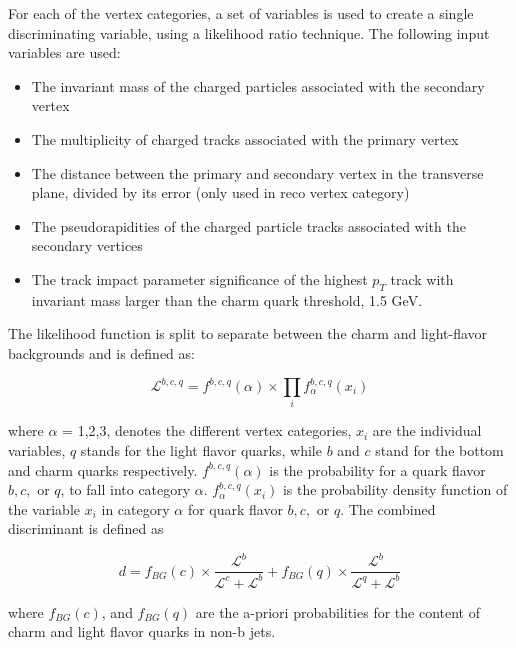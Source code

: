 \par For each of the vertex categories, a set of variables is used to
create a single discriminating variable, using a likelihood ratio
technique.  The following input variables are used:
\begin{itemize}
  \item The invariant mass of the charged particles associated with
    the secondary vertex
  \item The multiplicity of charged tracks associated with the primary
    vertex
  \item The distance between the primary and secondary vertex in the
    transverse plane, divided by its error (only used in reco vertex category)
  \item The pseudorapidities of the charged particle tracks associated
    with the secondary vertices
  \item The track impact parameter significance of the highest $p_{T}$
    track with invariant mass larger than the charm quark threshold,
    1.5 GeV. 
\end{itemize}

\noindent The likelihood function is split to separate between the
charm and light-flavor backgrounds and is defined as:

\begin{equation}\label{eq:csv_likelihood}
\mathcal{L}^{b,c,q} =
f^{b,c,q}(\alpha)\times\prod_{i}f_{\alpha}^{b,c,q}(x_{i})
\end{equation}

\noindent where $\alpha$ = 1,2,3, denotes the different vertex
categories, $x_{i}$ are the individual variables, $q$ stands for the
light flavor quarks, while $b$ and $c$ stand for the bottom and charm
quarks respectively.  $f^{b,c,q}(\alpha)$ is the probability for a
quark flavor $b,c,$ or $q$, to fall into category $\alpha$.
$f_{\alpha}^{b,c,q}(x_{i})$ is the probability density
function of the variable $x_{i}$ in category $\alpha$ for quark flavor
$b,c,$ or $q$.  The combined discriminant is defined as

\begin{equation}\label{eq:csv_disc}
d = f_{BG}(c)\times\frac{\mathcal{L}^{b}}{\mathcal{L}^{c} +
  \mathcal{L}^{b}} + f_{BG}(q)\times\frac{\mathcal{L}^{b}}{\mathcal{L}^{q} +
  \mathcal{L}^{b}}
\end{equation}

\noindent where $f_{BG}(c)$, and $f_{BG}(q)$ are
the a-priori probabilities for the content of charm and light flavor
quarks in non-b jets.  

